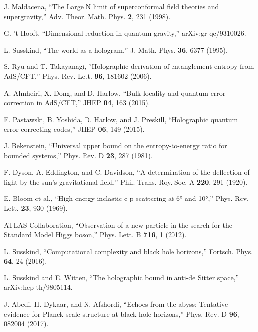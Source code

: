\documentclass[12pt,twocolumn]{article}
\theoremstyle{definition}
\theoremstyle{remark}
\begin{document}
\begin{thebibliography}{99}

J. Maldacena, 
``The Large N limit of superconformal field theories and supergravity,''
Adv. Theor. Math. Phys. \textbf{2}, 231 (1998).

G. 't Hooft,
``Dimensional reduction in quantum gravity,''
arXiv:gr-qc/9310026.

L. Susskind,
``The world as a hologram,''
J. Math. Phys. \textbf{36}, 6377 (1995).

S. Ryu and T. Takayanagi,
``Holographic derivation of entanglement entropy from AdS/CFT,''
Phys. Rev. Lett. \textbf{96}, 181602 (2006).

A. Almheiri, X. Dong, and D. Harlow,
``Bulk locality and quantum error correction in AdS/CFT,''
JHEP \textbf{04}, 163 (2015).

F. Pastawski, B. Yoshida, D. Harlow, and J. Preskill,
``Holographic quantum error-correcting codes,''
JHEP \textbf{06}, 149 (2015).

J. Bekenstein,
``Universal upper bound on the entropy-to-energy ratio for bounded systems,''
Phys. Rev. D \textbf{23}, 287 (1981).

F. Dyson, A. Eddington, and C. Davidson,
``A determination of the deflection of light by the sun's gravitational field,''
Phil. Trans. Roy. Soc. A \textbf{220}, 291 (1920).

E. Bloom et al.,
``High-energy inelastic e-p scattering at 6° and 10°,''
Phys. Rev. Lett. \textbf{23}, 930 (1969).

ATLAS Collaboration,
``Observation of a new particle in the search for the Standard Model Higgs boson,''
Phys. Lett. B \textbf{716}, 1 (2012).

L. Susskind,
``Computational complexity and black hole horizons,''
Fortsch. Phys. \textbf{64}, 24 (2016).

L. Susskind and E. Witten,
``The holographic bound in anti-de Sitter space,''
arXiv:hep-th/9805114.

J. Abedi, H. Dykaar, and N. Afshordi,
``Echoes from the abyss: Tentative evidence for Planck-scale structure at black hole horizons,''
Phys. Rev. D \textbf{96}, 082004 (2017).

\end{thebibliography}
\end{document}
